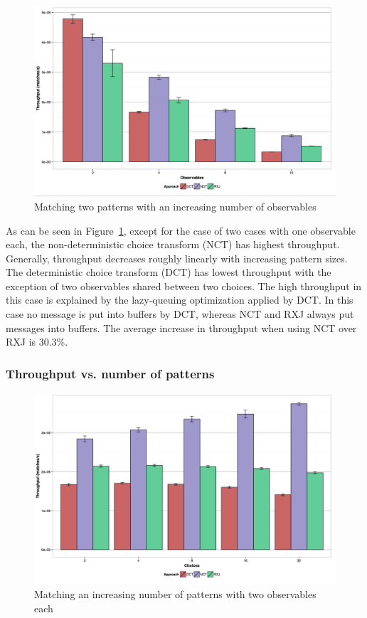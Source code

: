\documentclass[runningheads]{llncs}
\begin{document}
\begin{sloppypar}
\begin{figure}[h]
  \centering
  \includegraphics[scale=0.30]{img/two-patterns-N-observables.pdf}
  \caption{Matching two patterns with an increasing number of observables}
  \label{fig:TwoChoiceNObservables}
\end{figure}

As can be seen in Figure~\ref{fig:TwoChoiceNObservables}, except for the case
of two cases with one observable each, the non-deterministic choice transform
(NCT) has highest throughput. Generally, throughput decreases roughly linearly
with increasing pattern sizes. The deterministic choice transform (DCT) has
lowest throughput with the exception of two observables shared between two
choices. The high throughput in this case is explained by the lazy-queuing
optimization applied by DCT. In this case no message is put into buffers by
DCT, whereas NCT and RXJ always put messages into buffers. The average
increase in throughput when using NCT over RXJ is 30.3\%.

\subsubsection{Throughput vs. number of patterns}

\begin{figure}[h]
  \centering
  \includegraphics[scale=0.30]{img/N-patterns-two-observables.pdf}
  \caption{Matching an increasing number of patterns with two observables each}
  \label{fig:NChoiceTwoObservables}
\end{figure}


\end{sloppypar}
\end{document}
